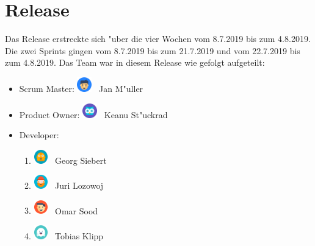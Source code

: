 \documentclass[12pt, titlepage]{scrartcl}
\newcommand{\RN}[1]{%
	\textup{\uppercase\expandafter{\romannumeral#1}}%
}
\begin{document}
    \section{Release \RN{3}}
        Das Release \RN{3} erstreckte sich "uber die vier Wochen vom 8.7.2019 bis zum 4.8.2019. Die zwei Sprints gingen vom 8.7.2019 bis zum 21.7.2019 und vom 22.7.2019 bis zum 4.8.2019.
        \vspace{0.1cm} \newline
        Das Team war in diesem Release wie gefolgt aufgeteilt:
        \begin{itemize}
            \item Scrum Master:  \hspace{0.275cm} \includegraphics[width=0.05\textwidth]{images/avatars/jan.png} \ Jan M"uller
    		\item Product Owner:   \hspace{0.1cm} \includegraphics[width=0.05\textwidth]{images/avatars/keanu.png} \ Keanu St"uckrad
    		\item Developer:
    		\begin{enumerate}
    		    \item \includegraphics[width=0.05\textwidth]{images/avatars/georg.png} \ Georg Siebert
    		    \item \includegraphics[width=0.05\textwidth]{images/avatars/juri.png} \ Juri Lozowoj
    		    \item \includegraphics[width=0.05\textwidth]{images/avatars/omar.png} \ Omar Sood 
    		    \item \includegraphics[width=0.05\textwidth]{images/avatars/tobias.png} \ Tobias Klipp
    		\end{enumerate}
        \end{itemize}
\end{document}
